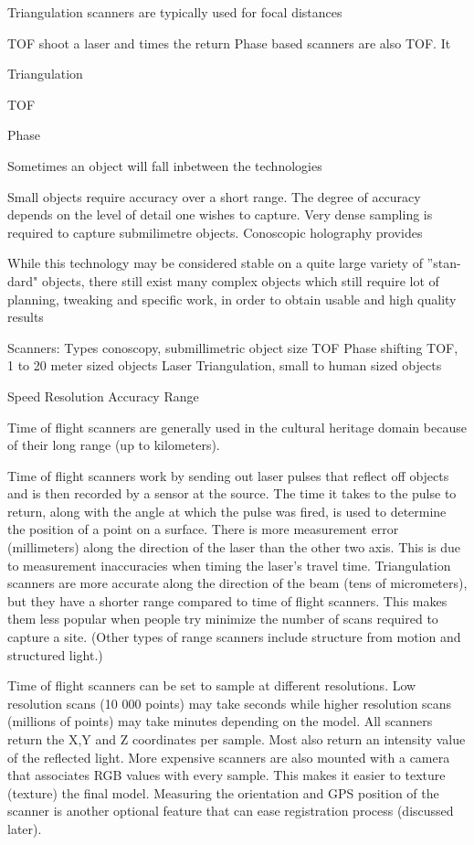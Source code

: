 Triangulation scanners are typically used for focal distances 




TOF shoot a laser and times the return
Phase based scanners are also TOF. It 


Triangulation

TOF

Phase


Sometimes an object will fall inbetween the technologies


Small objects require accuracy over a short range. The degree of accuracy depends on the level of detail one wishes to capture. Very dense sampling is required to capture submilimetre objects. Conoscopic holography provides


While this technology may be considered stable on a quite large variety of ”stan- dard" objects, there still exist many complex objects which still require lot of planning, tweaking and specific work, in order to obtain usable and high quality results



Scanners:
	Types
		conoscopy, submillimetric object size
		TOF
		Phase shifting TOF, 1 to 20 meter sized objects
		Laser Triangulation, small to human sized objects


	Speed
	Resolution
	Accuracy
	Range







 Time of flight scanners are generally used in the cultural heritage domain because of their long range (up to kilometers).

Time of flight scanners work by sending out laser pulses that reflect off objects and is then recorded by a sensor at the source. The time it takes to the pulse to return, along with the angle at which the pulse was fired, is used to determine the position of a point on a surface. There is more measurement error (millimeters) along the direction of the laser than the other two axis. This is due to measurement inaccuracies when timing the laser's travel time. Triangulation scanners are more accurate along the direction of the beam (tens of micrometers), but they have a shorter range compared to time of flight scanners. This makes them less popular when people try minimize the number of scans required to capture a site. (Other types of range scanners include structure from motion and structured light.)

Time of flight scanners can be set to sample at different resolutions. Low resolution scans (10 000 points) may take seconds while higher resolution scans (millions of points) may take minutes depending on the model. All scanners return the X,Y and Z coordinates per sample. Most also return an intensity value of the reflected light. More expensive scanners are also mounted with a camera that associates RGB values with every sample. This makes it easier to texture (texture) the final model. Measuring the orientation and GPS position of the scanner is another optional feature that can ease registration process (discussed later).

